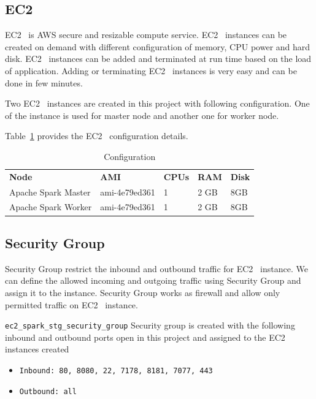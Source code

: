 \subsection{EC2}

EC2~\cite{hid-sp18-511-www-ec2} is AWS secure and resizable compute
service. EC2~\cite{hid-sp18-511-www-ec2} instances can be created on
demand with different configuration of memory, CPU power and hard
disk. EC2~\cite{hid-sp18-511-www-ec2} instances can be added and
terminated at run time based on the load of application. Adding or
terminating EC2~\cite{hid-sp18-511-www-ec2} instances is very easy and
can be done in few minutes.

Two EC2~\cite{hid-sp18-511-www-ec2} instances are created in this
project with following configuration. One of the instance is used for
master node and another one for worker node.

Table~\ref{t:ec2-configuration} provides the
EC2~\cite{hid-sp18-511-www-ec2} configuration details.

\begin{table}[]
	\centering \caption{Configuration}\label{t:ec2-configuration}
        \begin{tabular}{lllll} \textbf{Node}
	& \textbf{AMI} & \textbf{CPUs} & \textbf{RAM}
	& \textbf{Disk}\\ Apache Spark Master & ami-4e79ed361 & 1 & 2
	GB & 8GB\\ Apache Spark Worker & ami-4e79ed361 & 1 & 2 GB &
	8GB\\ \end{tabular}
\end{table}

\subsection{Security Group}

Security Group restrict the inbound and outbound traffic for
EC2~\cite{hid-sp18-511-www-ec2} instance.  We can define the allowed
incoming and outgoing traffic using Security Group and assign it to
the instance. Security Group works as firewall and allow only
permitted traffic on EC2~\cite{hid-sp18-511-www-ec2} instance.

\verb|ec2_spark_stg_security_group| Security group is created with the
following inbound and outbound ports open in this project and assigned
to the EC2~\cite{hid-sp18-511-www-ec2} instances created

\begin{itemize}
	\item \verb|Inbound: 80, 8080, 22, 7178, 8181, 7077, 443|
	\item \verb|Outbound: all|
	
\end{itemize}

